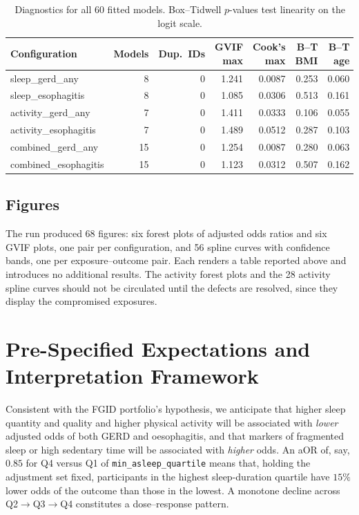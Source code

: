 \documentclass[11pt]{article}
\newcommand{\code}[1]{\texttt{\small #1}}
\begin{document}
\begin{table}[h]\centering\footnotesize\begin{tabular}{@{}lrrrrrr@{}}\toprule
\textbf{Configuration} & \textbf{Models} & \textbf{Dup.\ IDs} & \textbf{GVIF max} & \textbf{Cook's max} & \textbf{B--T BMI} & \textbf{B--T age} \\ \midrule
sleep\_gerd\_any & 8 & 0 & 1.241 & 0.0087 & 0.253 & 0.060 \\
sleep\_esophagitis & 8 & 0 & 1.085 & 0.0306 & 0.513 & 0.161 \\
activity\_gerd\_any & 7 & 0 & 1.411 & 0.0333 & 0.106 & 0.055 \\
activity\_esophagitis & 7 & 0 & 1.489 & 0.0512 & 0.287 & 0.103 \\
combined\_gerd\_any & 15 & 0 & 1.254 & 0.0087 & 0.280 & 0.063 \\
combined\_esophagitis & 15 & 0 & 1.123 & 0.0312 & 0.507 & 0.162 \\
\bottomrule\end{tabular}\caption{Diagnostics for all 60 fitted models. Box--Tidwell $p$-values test linearity on the logit scale.}\label{tab:res-diag}\end{table}

\subsection{Figures}
\label{sec:res-figs}
The run produced 68 figures: six forest plots of adjusted odds ratios and six GVIF plots, one pair
per configuration, and 56 spline curves with confidence bands, one per exposure--outcome pair. Each
renders a table reported above and introduces no additional results. The activity forest plots and
the 28 activity spline curves should not be circulated until the defects are resolved, since they
display the compromised exposures.


\section{Pre-Specified Expectations and Interpretation Framework}
Consistent with the FGID portfolio's hypothesis, we anticipate that higher sleep quantity and quality
and higher physical activity will be associated with \emph{lower} adjusted odds of both GERD and
oesophagitis, and that markers of fragmented sleep or high sedentary time will be associated with
\emph{higher} odds. An aOR of, say, $0.85$ for Q4 versus Q1 of \code{min_asleep_quartile} means that,
holding the adjustment set fixed, participants in the highest sleep-duration quartile have $15\%$ lower
odds of the outcome than those in the lowest. A monotone decline across
Q2$\rightarrow$Q3$\rightarrow$Q4 constitutes a dose--response pattern.
\end{document}
